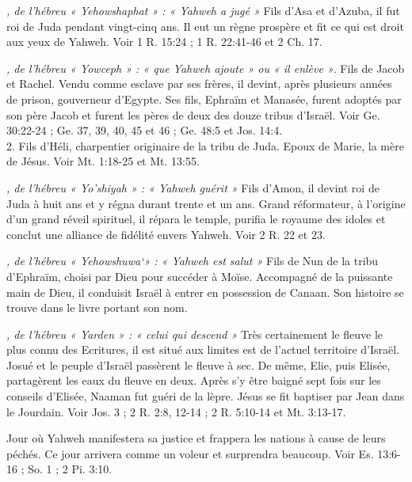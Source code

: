 \begin{multicols}{2}
\textit{, de l'hébreu « Yehowshaphat » : « Yahweh a jugé »}\newline
Fils d'Asa et d'Azuba, il fut roi de Juda pendant vingt-cinq ans. Il eut un règne prospère et fit ce qui est droit aux yeux de Yahweh. Voir 1 R. 15:24 ; 1 R. 22:41-46 et 2 Ch. 17.

\textit{, de l'hébreu « Yowceph » : « que Yahweh ajoute » ou « il enlève »}. Fils de Jacob et Rachel. Vendu comme esclave par ses frères, il devint, après plusieurs années de prison, gouverneur d'Egypte. Ses fils, Ephraïm et Manasée, furent adoptés par son père Jacob et furent les pères de deux des douze tribus d'Israël. Voir Ge. 30:22-24 ; Ge. 37, 39, 40, 45 et 46 ; Ge. 48:5 et Jos. 14:4.
\\2. Fils d'Héli, charpentier originaire de la tribu de Juda. Epoux de Marie, la mère de Jésus. Voir Mt. 1:18-25 et Mt. 13:55.

\textit{, de l'hébreu « Yo'shiyah » : « Yahweh guérit »}\newline
Fils d'Amon, il devint roi de Juda à huit ans et y régna durant trente et un ans. Grand réformateur, à l'origine d'un grand réveil spirituel, il répara le temple, purifia le royaume des idoles et conclut une alliance de fidélité envers Yahweh. Voir 2 R. 22 et 23.

\textit{, de l'hébreu « Yehowshuwa`» : « Yahweh est salut »}\newline
Fils de Nun de la tribu d'Ephraïm, choisi par Dieu pour succéder à Moïse. Accompagné de la puissante main de Dieu, il conduisit Israël à entrer en possession de Canaan. Son histoire se trouve dans le livre portant son nom.

\textit{, de l'hébreu « Yarden » : « celui qui descend »}\newline
Très certainement le fleuve le plus connu des Ecritures, il est situé aux limites est de l'actuel territoire d'Israël. Josué et le peuple d'Israël passèrent le fleuve à sec. De même, Elie, puis Elisée, partagèrent les eaux du fleuve en deux. Après s'y être baigné sept fois sur les conseils d'Elisée, Naaman fut guéri de la lèpre. Jésus se fit baptiser par Jean dans le Jourdain. Voir Jos. 3 ; 2 R. 2:8, 12-14 ; 2 R. 5:10-14 et Mt. 3:13-17.

\textit{}\newline
Jour où Yahweh manifestera sa justice et frappera les nations à cause de leurs péchés. Ce jour arrivera comme un voleur et surprendra beaucoup. Voir Es. 13:6-16 ; So. 1 ; 2 Pi. 3:10.


\end{multicols}
